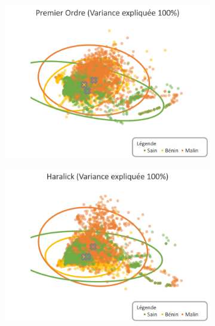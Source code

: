 \begin{figure}[H]
    \centering
    \begin{subfigure}{.49\textwidth}
      \includegraphics[width=\textwidth]{contents/chapter_5/resources/visualisation_spatial_FirstOrder.png}
    \end{subfigure}
    \begin{subfigure}{.49\textwidth}
      \includegraphics[width=\textwidth]{contents/chapter_5/resources/visualisation_spatial_Haralick.png}
    \end{subfigure}\vspace{10mm}
    

\end{figure}
